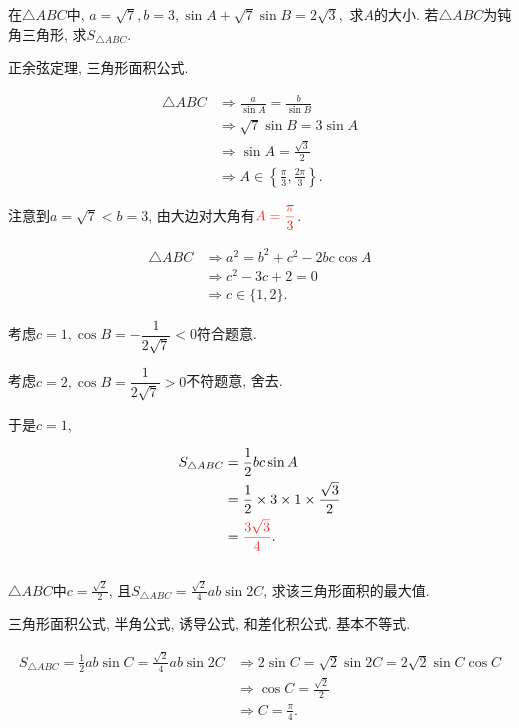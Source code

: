 \documentclass[8pt]{article}
\begin{document}
		在$\triangle ABC$中, $a=\sqrt{7}, b=3, \sin A + \sqrt{7} \sin B = 2\sqrt{3},$ 求$A$的大小. 若$\triangle ABC$为钝角三角形, 求$S_{\triangle ABC}$.

		正余弦定理, 三角形面积公式.

			\begin{align*}
				\triangle ABC &\Rightarrow \frac{a}{\sin A}=\frac{b}{\sin B}\\
				&\Rightarrow \sqrt{7} \sin B = 3\sin A\\
				&\Rightarrow \sin A = \frac{\sqrt{3}}{2}\\
				&\Rightarrow A\in\left\{\frac{\pi}{3}, \frac{2\pi}{3}\right\}.
			\end{align*}

			注意到$a=\sqrt{7}<b=3$, 由大边对大角有$\ansmath{A=\dfrac{\pi}{3}}$.

			\begin{align*}
				\triangle ABC &\Rightarrow a^2 = b^2 + c^2 - 2bc \cos A\\
				&\Rightarrow c^2 - 3c + 2 =0\\
				&\Rightarrow c\in\{1, 2\}.
			\end{align*}

			考虑$c=1, \cos B = -\dfrac{1}{2\sqrt{7}}<0$符合题意.

			考虑$c=2, \cos B = \dfrac{1}{2\sqrt{7}}>0$不符题意, 舍去.

			于是$c=1$,

			\begin{align*}
				S_{\triangle ABC} &= \frac{1}{2} bc\sin A\\
				&= \frac{1}{2} \times 3 \times 1 \times \frac{\sqrt{3}}{2}\\
				&= \ansmath{\frac{3\sqrt{3}}{4}}.
			\end{align*}
		~\\

		$\triangle ABC$中$c=\frac{\sqrt{2}}{2}$, 且$S_{\triangle ABC}=\frac{\sqrt{2}}{4} ab\sin 2C$, 求该三角形面积的最大值.

		三角形面积公式, 半角公式, 诱导公式, 和差化积公式. 基本不等式.

			\begin{align*}
				S_{\triangle ABC} = \frac{1}{2} ab \sin C = \frac{\sqrt{2}}{4}ab\sin 2C &\Rightarrow 2\sin C = \sqrt{2} \sin 2C = 2\sqrt{2} \sin C \cos C\\
				&\Rightarrow \cos C = \frac{\sqrt{2}}{2}\\
				&\Rightarrow C = \frac{\pi}{4}.
			\end{align*}
\end{document}
